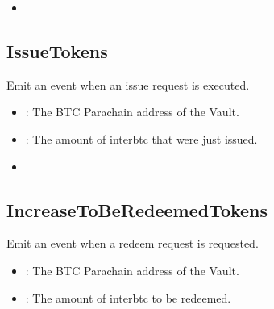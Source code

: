 \documentclass[a4paper,10pt,english]{sphinxmanual}
\begin{document}
\begin{itemize}
\item {} 
{\hyperref[\detokenize{spec/vault-registry:decreasetobeissuedtokens}]{}}

\end{itemize}


\subsection{IssueTokens}
\label{\detokenize{spec/vault-registry:id45}}
Emit an event when an issue request is executed.



\begin{itemize}
\item {} 
: The BTC Parachain address of the Vault.

\item {} 
: The amount of interbtc that were just issued.

\end{itemize}

\begin{itemize}
\item {} 
{\hyperref[\detokenize{spec/vault-registry:issuetokens}]{}}

\end{itemize}


\subsection{IncreaseToBeRedeemedTokens}
\label{\detokenize{spec/vault-registry:increasetoberedeemedtokens}}
Emit an event when a redeem request is requested.



\begin{itemize}
\item {} 
: The BTC Parachain address of the Vault.

\item {} 
: The amount of interbtc to be redeemed.

\end{itemize}
\end{document}
